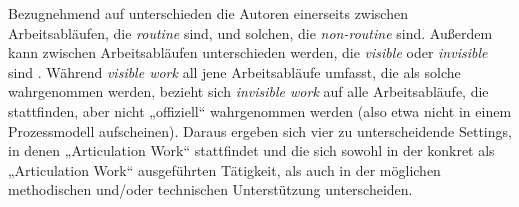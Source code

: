 Bezugnehmend auf \citet{Strauss93} unterschieden die Autoren einerseits zwischen Arbeitsabläufen, die \emph{routine} sind, und solchen, die \emph{non-routine} sind. Außerdem kann zwischen Arbeitsabläufen unterschieden werden, die \emph{visible} oder \emph{invisible} sind \citep{Star99}. Während \emph{visible work} all jene Arbeitsabläufe umfasst, die als solche wahrgenommen werden, bezieht sich \emph{invisible work} auf alle Arbeitsabläufe, die stattfinden, aber nicht „offiziell“ wahrgenommen werden (also etwa nicht in einem Prozessmodell aufscheinen).  Daraus ergeben sich vier zu unterscheidende Settings, in denen „Articulation Work“ stattfindet und die sich sowohl in der konkret als „Articulation Work“ ausgeführten Tätigkeit, als auch in der möglichen methodischen und/oder technischen Unterstützung unterscheiden.

